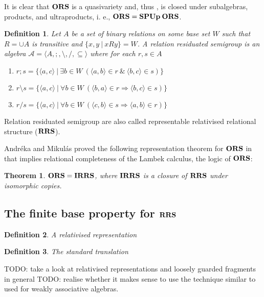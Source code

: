 \documentclass[a4paper]{article}
\theoremstyle{defin}
\newtheorem{defin}{Definition}
\theoremstyle{theorem}
\newtheorem{theorem}{Theorem}
\theoremstyle{prop}
\theoremstyle{lemma}
\theoremstyle{ex}
\theoremstyle{col}
\begin{document}
It is clear that ${\bf ORS}$ is a quasivariety and, thus \cite{mal2012algebraic}, is closed under subalgebras, products, and ultraproducts, i. e.,
${\bf ORS} = {\bf S}{\bf P}{\bf Up} \: {\bf ORS}$.

\begin{defin} \label{rrs}
  Let $A$ be a set of binary relations on some base set $W$ such that $R = \cup A$ is transitive and $\{ x, y \: | \: x R y \} = W$. A relation residuated semigroup is an algebra $\mathcal{A} = \langle A, ;, \setminus, /, \subseteq \rangle$ where for each $r, s \in A$
  \begin{enumerate}
    \item $r ; s = \{ \langle a, c \rangle \: | \: \exists b \in W \: (\langle a, b \rangle \in r \: \& \: \langle b, c \rangle \in s) \}$
    \item $r \setminus s = \{ \langle a, c \rangle \: | \: \forall b \in W \: (\langle b, a \rangle \in r \Rightarrow \langle b, c \rangle \in s)\}$
    \item $r / s = \{ \langle a, c \rangle \: | \: \forall b \in W \: (\langle c, b \rangle \in s \Rightarrow \langle a, b \rangle \in r)\}$
  \end{enumerate}
\end{defin}
Relation residuated semigroup are also called representable relativised relational structure (${\bf RRS}$).

Andr\'{e}ka and Mikul\'{a}s proved the following representation theorem for ${\bf ORS}$ in \cite{andreka1994lambek} that implies relational completeness of the Lambek calculus, the logic of ${\bf ORS}$:

\begin{theorem}\label{ors=irrs}
  ${\bf ORS} = {\bf IRRS}$, where ${\bf IRRS}$ is a closure of ${\bf RRS}$ under isomorphic copies.
\end{theorem}

\subsection{The finite base property for ${\bf RRS}$}

\begin{defin}
  A relativised representation
\end{defin}

\begin{defin}
  The standard translation
\end{defin}

TODO: take a look at relativised representations and loosely guarded fragments in general
TODO: realise whether it makes sense to use the technique similar to \cite[Theorem 19.13]{hirsch2002relation}
used for weakly associative algebras.
\end{document}
